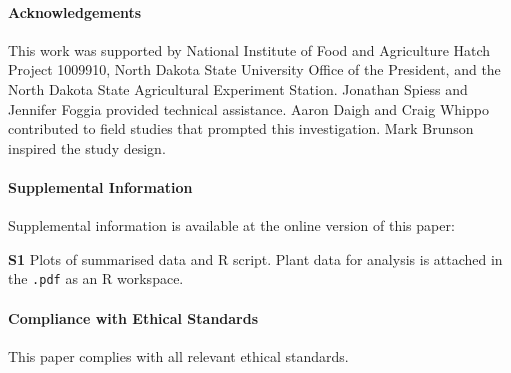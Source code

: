 \documentclass{svjour3}
\begin{document}
\paragraph{Acknowledgements}
This work was supported by National Institute of Food and Agriculture Hatch Project 1009910, North Dakota State University Office of the President, and the North Dakota State Agricultural Experiment Station.
Jonathan Spiess and Jennifer Foggia provided technical assistance. 
Aaron Daigh and Craig Whippo contributed to field studies that prompted this investigation.
Mark Brunson inspired the study design.

\paragraph{Supplemental Information}

Supplemental information is available at the online version of this paper:

\textbf{S1} Plots of summarised data and \textsf{R} script.
Plant data for analysis is attached in the \texttt{.pdf} as an \textsf{R} workspace.

\paragraph{Compliance with Ethical Standards}
This paper complies with all relevant ethical standards. 

      
 
\end{document}
